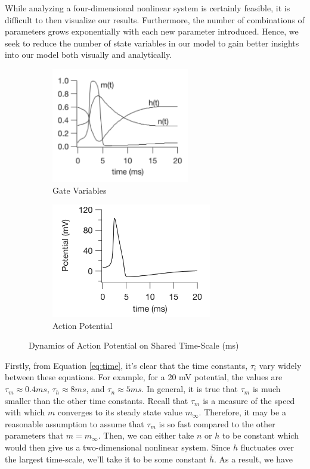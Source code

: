 \documentclass{article}
\begin{document}
While analyzing a four-dimensional nonlinear system is certainly feasible, it is difficult to then visualize our results. Furthermore, the number of combinations of parameters grows exponentially with each new parameter introduced. Hence, we seek to reduce the number of state variables in our model to gain better insights into our model both visually and analytically. 

\begin{figure}[h]
\centering
\begin{subfigure}{.5\textwidth}
	\centering
	\includegraphics[height=5cm]{keener1.png}
	\caption{Gate Variables}
\end{subfigure}%
\begin{subfigure}{.5\textwidth}
	\centering
	\includegraphics[height=5cm]{keener2.png}
	\caption{Action Potential}
\end{subfigure}
	\caption{Dynamics of Action Potential on Shared Time-Scale (ms)}
	\label{fig:keen}
\end{figure}


Firstly, from Equation \ref{eq:time}, it's clear that the time constants, $\tau_i$ vary widely between these equations. For example, for a 20 mV potential, the values are $\tau_m \approx 0.4 ms$, $\tau_h \approx 8 ms$, and $\tau_n \approx 5 ms$. In general, it is true that $\tau_m$ is much smaller than the other time constants. Recall that $\tau_m$ is a measure of the speed with which $m$ converges to its steady state value $m_\infty$. Therefore, it may be a reasonable assumption to assume that $\tau_m$ is so fast compared to the other parameters that $m = m_\infty$. Then, we can either take $n$ or $h$ to be constant which would then give us a two-dimensional nonlinear system. Since $h$ fluctuates over the largest time-scale, we'll take it to be some constant $\bar{h}$. As a result, we have 
\end{document}
